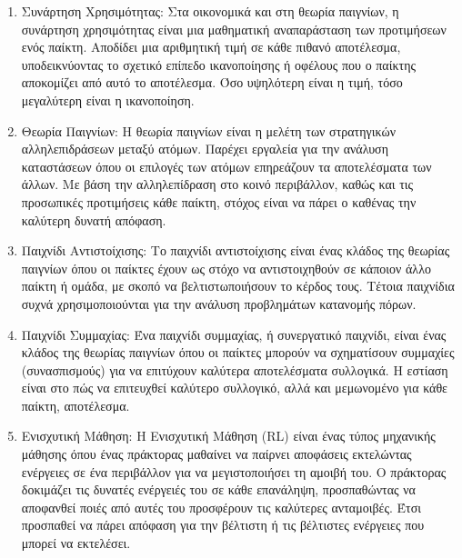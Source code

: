 \begin{enumerate}
    \item Συνάρτηση Χρησιμότητας: Στα οικονομικά και στη θεωρία παιγνίων, η συνάρτηση χρησιμότητας είναι μια μαθηματική αναπαράσταση των προτιμήσεων ενός παίκτη. Αποδίδει μια αριθμητική τιμή σε κάθε πιθανό αποτέλεσμα, υποδεικνύοντας το σχετικό επίπεδο ικανοποίησης ή οφέλους που ο παίκτης αποκομίζει από αυτό το αποτέλεσμα. Όσο υψηλότερη είναι η τιμή, τόσο μεγαλύτερη είναι η ικανοποίηση.

    \item Θεωρία Παιγνίων: Η θεωρία παιγνίων είναι η μελέτη των στρατηγικών αλληλεπιδράσεων μεταξύ ατόμων. Παρέχει εργαλεία για την ανάλυση καταστάσεων όπου οι επιλογές των ατόμων επηρεάζουν τα αποτελέσματα των άλλων. Με βάση την αλληλεπίδραση στο κοινό περιβάλλον, καθώς και τις προσωπικές προτιμήσεις κάθε παίκτη, στόχος είναι να πάρει ο καθένας την καλύτερη δυνατή απόφαση.

    \item Παιχνίδι Αντιστοίχισης: Το παιχνίδι αντιστοίχισης είναι ένας κλάδος της θεωρίας παιγνίων όπου οι παίκτες έχουν ως στόχο να αντιστοιχηθούν σε κάποιον άλλο παίκτη ή ομάδα, με σκοπό να βελτιστωποιήσουν το κέρδος τους. Τέτοια παιχνίδια συχνά χρησιμοποιούνται για την ανάλυση προβλημάτων κατανομής πόρων.

    \item Παιχνίδι Συμμαχίας: Ένα παιχνίδι συμμαχίας, ή συνεργατικό παιχνίδι, είναι ένας κλάδος της θεωρίας παιγνίων όπου οι παίκτες μπορούν να σχηματίσουν συμμαχίες (συνασπισμούς) για να επιτύχουν καλύτερα αποτελέσματα συλλογικά. Η εστίαση είναι στο πώς να επιτευχθεί καλύτερο συλλογικό, αλλά και μεμωνομένο για κάθε παίκτη, αποτέλεσμα.

    \item Ενισχυτική Μάθηση: Η Ενισχυτική Μάθηση (RL) είναι ένας τύπος μηχανικής μάθησης όπου ένας πράκτορας μαθαίνει να παίρνει αποφάσεις εκτελώντας ενέργειες σε ένα περιβάλλον για να μεγιστοποιήσει τη αμοιβή του. Ο πράκτορας δοκιμάζει τις δυνατές ενέργειές του σε κάθε επανάληψη, προσπαθώντας να αποφανθεί ποιές από αυτές του προσφέρουν τις καλύτερες ανταμοιβές. Έτσι προσπαθεί να πάρει απόφαση για την βέλτιστη ή τις βέλτιστες ενέργειες που μπορεί να εκτελέσει.


\end{enumerate}
